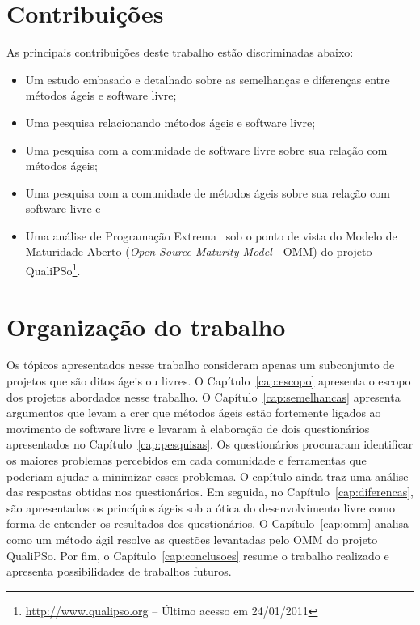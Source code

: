 \section{Contribuições}
\label{sec:contribucoes}

As principais contribuições deste trabalho estão discriminadas abaixo:

\begin{itemize}
\item Um estudo embasado e detalhado sobre as semelhanças e diferenças
  entre métodos ágeis e software livre;
\item Uma pesquisa relacionando métodos ágeis e software livre;
\item Uma pesquisa com a comunidade de software livre sobre sua
  relação com métodos ágeis;
\item Uma pesquisa com a comunidade de métodos ágeis sobre sua relação
  com software livre e
\item Uma análise de Programação Extrema~\cite{XP01} sob o ponto de
  vista do Modelo de Maturidade Aberto (\emph{Open Source Maturity
    Model} - OMM) do projeto
  QualiPSo\footnote{\url{http://www.qualipso.org} -- Último acesso em
    24/01/2011}.
\end{itemize}

\section{Organização do trabalho}
\label{sec:organizacao_trabalho}

Os tópicos apresentados nesse trabalho consideram apenas um
subconjunto de projetos que são ditos ágeis ou livres. O
Capítulo~\ref{cap:escopo} apresenta o escopo dos projetos abordados
nesse trabalho. O Capítulo~\ref{cap:semelhancas} apresenta argumentos
que levam a crer que métodos ágeis estão fortemente ligados ao
movimento de software livre e levaram à elaboração de dois
questionários apresentados no Capítulo~\ref{cap:pesquisas}. Os
questionários procuraram identificar os maiores problemas percebidos
em cada comunidade e ferramentas que poderiam ajudar a minimizar esses
problemas. O capítulo ainda traz uma análise das respostas obtidas nos
questionários.  Em seguida, no Capítulo~\ref{cap:diferencas}, são
apresentados os princípios ágeis sob a ótica do desenvolvimento livre
como forma de entender os resultados dos questionários. O
Capítulo~\ref{cap:omm} analisa como um método ágil resolve as questões
levantadas pelo OMM do projeto QualiPSo.  Por fim, o
Capítulo~\ref{cap:conclusoes} resume o trabalho realizado e apresenta
possibilidades de trabalhos futuros.
